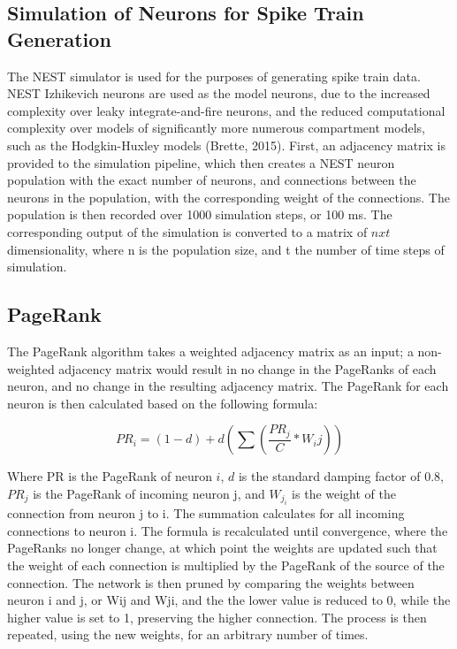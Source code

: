 \documentclass{article}
\begin{document}
\subsection{Simulation of Neurons for Spike Train Generation}
The NEST simulator is used for the purposes of generating spike train data. NEST Izhikevich neurons are used as the model neurons, due to the increased complexity over leaky integrate-and-fire neurons, and the reduced computational complexity over models of significantly more numerous compartment models, such as the Hodgkin-Huxley models (Brette, 2015). First, an adjacency matrix is provided to the simulation pipeline, which then creates a NEST neuron population with the exact number of neurons, and connections between the neurons in the population, with the corresponding weight of the connections. The population is then recorded over 1000 simulation steps, or 100 ms. The corresponding output of the simulation is converted to a matrix of $n x t$ dimensionality, where n is the population size, and t the number of time steps of simulation.\par

\subsection{PageRank}
The PageRank algorithm takes a weighted adjacency matrix as an input; a non-weighted adjacency matrix would result in no change in the PageRanks of each neuron, and no change in the resulting adjacency matrix. The PageRank for each neuron is then calculated based on the following formula:

$$PR_i = (1-d)+d(\sum(\frac{PR_j}{C} * W_ij))$$

Where PR is the PageRank of neuron $i$, $d$ is the standard damping factor of 0.8, $PR_j$ is the PageRank of incoming neuron j, and $W_j_i$ is the weight of the connection from neuron j to i. The summation calculates for all incoming connections to neuron i. The formula is recalculated until convergence, where the PageRanks no longer change, at which point the weights are updated such that the weight of each connection is multiplied by the PageRank of the source of the connection. The network is then pruned by comparing the weights between neuron i and j, or Wij and Wji, and the the lower value is reduced to 0, while the higher value is set to 1, preserving the higher connection. The process is then repeated, using the new weights, for an arbitrary number of times.\par
\end{document}
